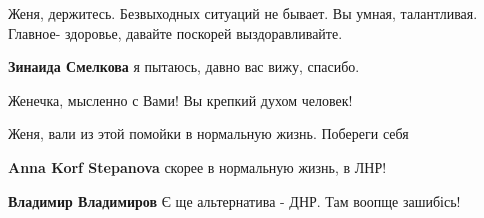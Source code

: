 \begin{itemize}
 
Женя, держитесь. Безвыходных ситуаций не бывает. Вы умная, талантливая. Главное- здоровье, давайте поскорей выздоравливайте.

 
\textbf{Зинаида Смелкова} я пытаюсь, давно вас вижу, спасибо.

 
Женечка, мысленно с Вами! Вы крепкий духом человек!

 
Женя, вали из этой помойки в нормальную жизнь. Побереги себя

\begin{itemize}
 
\textbf{Anna Korf Stepanova} скорее в нормальную жизнь, в ЛНР!

 
\textbf{Владимир Владимиров} Є ще альтернатива - ДНР. Там воопще зашибісь!

 

\end{itemize}
\end{itemize}
